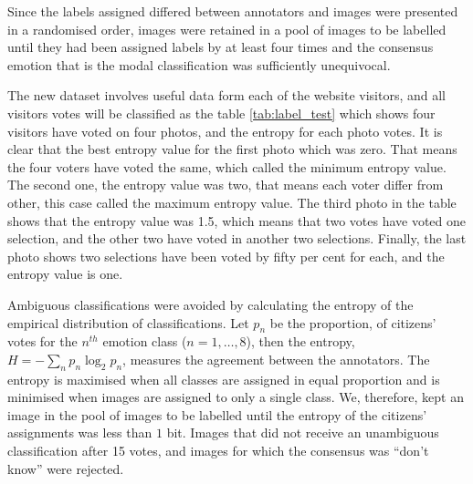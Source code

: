  \begin{table}[t]
  \caption{Voting data sample}\label{tab:label_test}

\end{table} 

 
 Since the labels assigned differed between annotators and images were presented in a randomised order, images were retained in a pool of images to be labelled until they had been assigned labels by at least four times and the consensus emotion that is the modal classification was sufficiently unequivocal.
 
 The new dataset involves useful data form each of the website visitors, and all visitors votes will be classified as the table \ref{tab:label_test}
which shows four visitors have voted on four photos, and the entropy for each photo votes. It is clear that the best entropy value for the first photo which was zero. That means the four voters have voted the same, which called the minimum entropy value. The second one, the entropy value was two, that means each voter differ from other, this case called the maximum entropy value. The third photo in the table shows that the entropy value was 1.5, which means that two votes have voted one selection, and the other two have voted in another two selections. Finally, the last photo shows two selections have been voted by fifty per cent for each, and the entropy value is one.  
  
   Ambiguous classifications were avoided by calculating the entropy of the empirical distribution of classifications. Let $p_n$ be the proportion, of citizens' votes for the $n^{th}$ emotion class ($n = 1, \ldots, 8$), then the entropy, $H = -\sum_n p_n \log_2 p_n$, measures the agreement between the annotators. The entropy is maximised when all classes are assigned in equal proportion and is minimised when images are assigned to only a single class.  We, therefore, kept an image in the pool of images to be labelled until the entropy of the citizens' assignments was less than $1$ bit.  Images that did not receive an unambiguous classification after 15 votes, and images for which the consensus was ``don't know'' were rejected.
 

